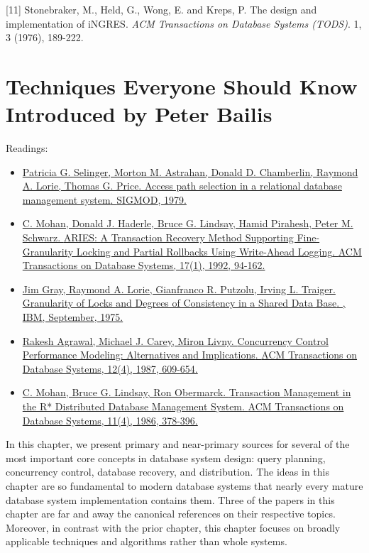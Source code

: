 \documentclass[b5paper,11pt,twoside,openright]{book}
\newcommand\Chapter[3]{
  \hypertarget{#1}{
    \chapter[#2]{#2\\{\Large #3}}\label{#1}
  }
}
\begin{document}
\leavevmode\hypertarget{ref-ingres}{}%
{[}11{]} Stonebraker, M., Held, G., Wong, E. and Kreps, P. The design
and implementation of iNGRES. \emph{ACM Transactions on Database Systems
  (TODS)}. 1, 3 (1976), 189-222.


\Chapter{ch3-techniques}{%
Techniques Everyone Should Know}{%
Introduced by Peter Bailis
}

\begin{framed}
Readings:

\begin{itemize}
\item
\href{https://scholar.google.com/scholar?cluster=102545501597608314}{Patricia
  G. Selinger, Morton M. Astrahan, Donald D. Chamberlin, Raymond A. Lorie,
  Thomas G. Price. {Access path selection in a relational database
    management system}. {SIGMOD}, 1979.}
\item
\href{https://scholar.google.com/scholar?cluster=2142924814045750364}{C.
  Mohan, Donald J. Haderle, Bruce G. Lindsay, Hamid Pirahesh, Peter M.
  Schwarz. {ARIES: A Transaction Recovery Method Supporting
    Fine-Granularity Locking and Partial Rollbacks Using Write-Ahead
    Logging}. {ACM Transactions on Database Systems}, 17(1), 1992, 94-162.}
\item
\href{https://scholar.google.com/scholar?cluster=15730220590995320737}{Jim
  Gray, Raymond A. Lorie, Gianfranco R. Putzolu, Irving L. Traiger.
  {Granularity of Locks and Degrees of Consistency in a Shared Data Base}.
  {}, IBM, September, 1975.}
\item
\href{https://scholar.google.com/scholar?cluster=9784855600346107276}{Rakesh
  Agrawal, Michael J. Carey, Miron Livny. {Concurrency Control Performance
    Modeling: Alternatives and Implications}. {ACM Transactions on Database
    Systems}, 12(4), 1987, 609-654.}
\item
\href{https://scholar.google.com/scholar?cluster=6135007404184895390}{C.
  Mohan, Bruce G. Lindsay, Ron Obermarck. {Transaction Management in the
    R* Distributed Database Management System}. {ACM Transactions on
    Database Systems}, 11(4), 1986, 378-396.}
\end{itemize}
\end{framed}

In this chapter, we present primary and near-primary sources for several
of the most important core concepts in database system design: query
planning, concurrency control, database recovery, and distribution. The
ideas in this chapter are so fundamental to modern database systems that
nearly every mature database system implementation contains them. Three
of the papers in this chapter are far and away the canonical references
on their respective topics. Moreover, in contrast with the prior
chapter, this chapter focuses on broadly applicable techniques and
algorithms rather than whole systems.
\end{document}
